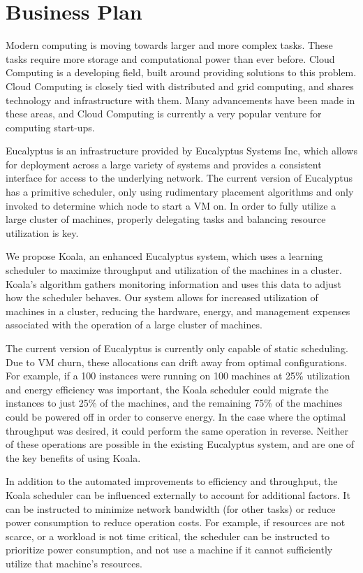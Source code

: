 \section{Business Plan}
  Modern computing is moving towards larger and more complex tasks.  These tasks require more storage and computational power than ever before.  Cloud Computing is a developing field, built around providing solutions to this problem.  Cloud Computing is closely tied with distributed and grid computing, and shares technology and infrastructure with them.  Many advancements have been made in these areas, and Cloud Computing is currently a very popular venture for computing start-ups.

  Eucalyptus is an infrastructure provided by Eucalyptus Systems Inc, which allows for deployment across a large variety of systems and provides a consistent interface for access to the underlying network.  The current version of Eucalyptus has a primitive scheduler, only using rudimentary placement algorithms and only invoked to determine which node to start a VM on.  In order to fully utilize a large cluster of machines, properly delegating tasks and balancing resource utilization is key.

  We propose Koala, an enhanced Eucalyptus system, which uses a learning scheduler to maximize throughput and utilization of the machines in a cluster.  Koala's algorithm gathers monitoring information and uses this data to adjust how the scheduler behaves.  Our system allows for increased utilization of machines in a cluster, reducing the hardware, energy, and management expenses associated with the operation of a large cluster of machines.

  The current version of Eucalyptus is currently only capable of static scheduling.  Due to VM churn, these allocations can drift away from optimal configurations.  For example, if a 100 instances were running on 100 machines at 25\% utilization and energy efficiency was important, the Koala scheduler could migrate the instances to just 25\% of the machines, and the remaining 75\% of the machines could be powered off in order to conserve energy.  In the case where the optimal throughput was desired, it could perform the same operation in reverse.  Neither of these operations are possible in the existing Eucalyptus system, and are one of the key benefits of using Koala.

  In addition to the automated improvements to efficiency and throughput, the Koala scheduler can be influenced externally to account for additional factors.  It can be instructed to minimize network bandwidth (for other tasks) or reduce power consumption to reduce operation costs.  For example, if resources are not scarce, or a workload is not time critical, the scheduler can be instructed to prioritize power consumption, and not use a machine if it cannot sufficiently utilize that machine's resources.


